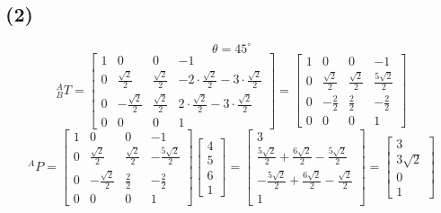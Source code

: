 \documentclass{article}
\begin{document}
\subsection*{(2)}
\[
    \theta = 45^\circ
\]
\[
    {}^{A}_{B}T = 
    \begin{bmatrix}
        1 & 0 & 0 & -1 \\[0.3em]
        0 & \tfrac{\sqrt{2}}{2} & \tfrac{\sqrt{2}}{2} & -2 \cdot \tfrac{\sqrt{2}}{2} - 3 \cdot \tfrac{\sqrt{2}}{2} \\[0.3em]
        0 & -\tfrac{\sqrt{2}}{2} & \tfrac{\sqrt{2}}{2} & 2 \cdot \tfrac{\sqrt{2}}{2} - 3 \cdot \tfrac{\sqrt{2}}{2} \\[0.3em]
        0 & 0 & 0 & 1
    \end{bmatrix}
    =
    \begin{bmatrix}
        1 & 0 & 0 & -1 \\[0.3em]
        0 & \tfrac{\sqrt{2}}{2} & \tfrac{\sqrt{2}}{2} & \tfrac{5\sqrt{2}}{2} \\[0.3em]
        0 & -\tfrac{2}{2} & \tfrac{2}{2} & -\tfrac{2}{2} \\[0.3em]
        0 & 0 & 0 & 1

    \end{bmatrix}
\]
\[
    {}^{A}_{}P = 
    \begin{bmatrix}
        1 & 0 & 0 & -1 \\
        0 & \tfrac{\sqrt{2}}{2} & \tfrac{\sqrt{2}}{2} & -\tfrac{5\sqrt{2}}{2} \\
        0 & -\tfrac{\sqrt{2}}{2} & \tfrac{2}{2} & -\tfrac{2}{2} \\
        0 & 0 & 0 & 1
    \end{bmatrix}
    \begin{bmatrix}
        4 \\
        5 \\
        6 \\
        1
    \end{bmatrix}
    =
    \begin{bmatrix}
        3 \\
        \tfrac{5\sqrt{2}}{2} + \tfrac{6\sqrt{2}}{2} - \tfrac{5\sqrt{2}}{2} \\
        -\tfrac{5\sqrt{2}}{2} + \tfrac{6\sqrt{2}}{2} - \tfrac{\sqrt{2}}{2} \\
        1
    \end{bmatrix}
    =
    \begin{bmatrix}
        3 \\
        3\sqrt{2} \\
        0 \\
        1
    \end{bmatrix}
\]
\end{document}
